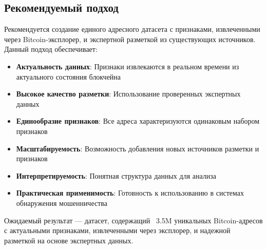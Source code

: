 \subsection{Рекомендуемый подход}

Рекомендуется создание единого адресного датасета с признаками, извлеченными через Bitcoin-эксплорер, и экспертной разметкой из существующих источников. Данный подход обеспечивает:

\begin{itemize}
    \item \textbf{Актуальность данных}: Признаки извлекаются в реальном времени из актуального состояния блокчейна
    \item \textbf{Высокое качество разметки}: Использование проверенных экспертных данных
    \item \textbf{Единообразие признаков}: Все адреса характеризуются одинаковым набором признаков
    \item \textbf{Масштабируемость}: Возможность добавления новых источников разметки и признаков
    \item \textbf{Интерпретируемость}: Понятная структура данных для анализа
    \item \textbf{Практическая применимость}: Готовность к использованию в системах обнаружения мошенничества
\end{itemize}

Ожидаемый результат — датасет, содержащий ~3.5M уникальных Bitcoin-адресов с актуальными признаками, извлеченными через эксплорер, и надежной разметкой на основе экспертных данных.
